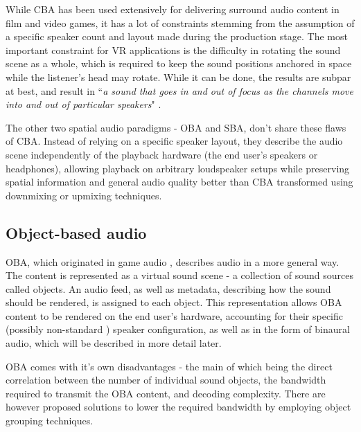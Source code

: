 While CBA has been used extensively for delivering surround audio content in film and video games, it has a lot of constraints stemming 
from the assumption of a specific speaker count and layout made during the production stage. 
The most important constraint for VR applications is the difficulty in rotating the sound scene as a whole, 
which is required to keep the sound positions anchored in space while the listener's head may rotate.
While it can be done, the results are subpar at best, and result in ``\emph{a sound that goes in and out of focus
as the channels move into and out of particular speakers}" \cite[p.~45]{new_realities_in_audio}.

The other two spatial audio paradigms - OBA and SBA, don't share these flaws of CBA. \cite{ebu_sbo_hoa}\cite{system_for_oba}
Instead of relying on a specific speaker layout, they describe the audio scene independently of the playback hardware (the end user's speakers or headphones),
allowing playback on arbitrary loudspeaker setups while preserving spatial information and 
general audio quality better than CBA transformed using downmixing or upmixing techniques. \cite{system_for_oba}\cite{sba_using_hoa}

\subsection{Object-based audio}
OBA, which originated in game audio \cite{cambridge_imm_audio_review}, describes audio in a more general way. 
The content is represented as a virtual sound scene - a collection of sound sources called objects. \cite{ss_with_speakers_review}
An audio feed, as well as metadata, describing how the sound should be rendered, is assigned to each object. \cite{ss_with_speakers_review}\cite{cambridge_imm_audio_review}
This representation allows OBA content to be rendered on the end user's hardware, accounting for 
their specific (possibly non-standard \cite{oba_panner_patent}) speaker configuration,
as well as in the form of binaural audio, which will be described in more detail later. \cite{system_for_oba}\cite{cambridge_imm_audio_review}

OBA comes with it's own disadvantages - the main of which being the direct correlation
between the number of individual sound objects, the bandwidth required to transmit the OBA content, and decoding complexity. \cite{ebu_sbo_hoa}
There are however proposed solutions to lower the required bandwidth by employing object grouping techniques. \cite{breebaart2019spatial}

